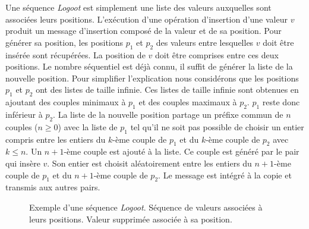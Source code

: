Une séquence \emph{Logoot} est simplement une liste des valeurs auxquelles sont associées leurs positions.
L'exécution d'une opération d'insertion d'une valeur $v$ produit un message d'insertion composé de la valeur et de sa position.
Pour générer sa position, les positions $p_1$ et $p_2$ des valeurs entre lesquelles $v$ doit être insérée sont récupérées.
La position de $v$ doit être comprises entre ces deux positions.
Le nombre séquentiel est déjà connu, il suffit de générer la liste de la nouvelle position.
Pour simplifier l'explication nous considérons que les positions $p_1$ et $p_2$ ont des listes de taille infinie.
Ces listes de taille infinie sont obtenues en ajoutant des couples minimaux à $p_1$ et des couples maximaux à $p_2$.
$p_1$ reste donc inférieur à $p_2$.
La liste de la nouvelle position partage un préfixe commun de $n$ couples ($n \geq 0$) avec la liste de $p_1$ tel qu'il ne soit pas possible de choisir un entier compris entre les entiers du $k$-ème couple de $p_1$ et du $k$-ème couple de $p_2$ avec $k \leq n$.
Un $n+1$-ème couple est ajouté à la liste.
Ce couple est généré par le pair qui insère $v$.
Son entier est choisit aléatoirement entre les entiers du $n+1$-ème couple de $p_1$ et du $n+1$-ème couple de $p_2$.
Le message est intégré à la copie et transmis aux autres pairs.

\begin{figure}[tb]
\centering
\begin{subfigure}[b]{0.69\linewidth}
    \centering
    \caption{}\label{fig:logoot-1}
\end{subfigure}
\begin{subfigure}[b]{0.29\linewidth}
    \centering
    \caption{}\label{fig:logoot-2}
\end{subfigure}
\caption[Exemple d'une séquence \emph{Logoot}]{Exemple d'une séquence \emph{Logoot}.
 Séquence de valeurs associées à leurs positions.
 Valeur supprimée associée à sa position.}\label{fig:logoot}
\end{figure}

